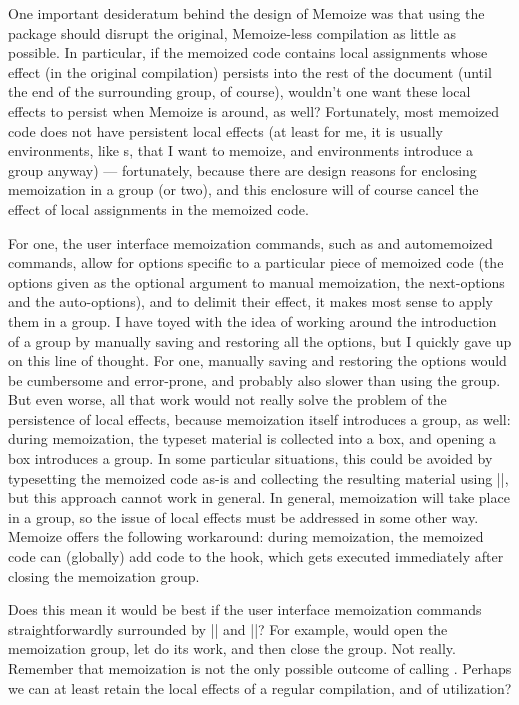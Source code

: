\documentclass[a4paper,11pt]{article}
\begin{document}
\begin{tcolorbox}[title=\string\Memoize\ and grouping, enhanced, breakable,
    label=frame:grouping]
  One important desideratum behind the design of Memoize was that using the
  package should disrupt the original, Memoize-less compilation as little as
  possible.  In particular, if the memoized code contains local assignments
  whose effect (in the original compilation) persists into the rest of the
  document (until the end of the surrounding  group, of course),
  wouldn't one want these local effects to persist when Memoize is around, as
  well?  Fortunately, most memoized code does not have persistent local effects
  (at least for me, it is usually environments, like s, that I
  want to memoize, and environments introduce a group anyway) --- fortunately,
  because there are design reasons for enclosing memoization in a 
  group (or two), and this enclosure will of course cancel the effect of local
  assignments in the memoized code.

  For one, the user interface memoization commands, such as  and
  automemoized commands, allow for options specific to a particular piece of
  memoized code (the options given as the optional argument to manual
  memoization, the next-options and the auto-options), and to delimit their
  effect, it makes most sense to apply them in a group.  I have toyed with the
  idea of working around the introduction of a group by manually saving and
  restoring all the options, but I quickly gave up on this line of thought.
  For one, manually saving and restoring the options would be cumbersome and
  error-prone, and probably also slower than using the group.  But even worse,
  all that work would not really solve the problem of the persistence of local
  effects, because memoization itself introduces a group, as well: during
  memoization, the typeset material is collected into a box, and opening a box
  introduces a group.  In some particular situations, this could be avoided by
  typesetting the memoized code as-is and collecting the resulting material
  using |\lastbox|, but this approach cannot work in general.  In general,
  memoization will take place in a group, so the issue of local effects must be
  addressed in some other way.  Memoize offers the following workaround: during
  memoization, the memoized code can (globally) add code to the  hook, which gets executed immediately after closing the
  memoization group.

  Does this mean it would be best if the user interface memoization commands
  straightforwardly surrounded  by |\begingroup| and
  |\endgroup|?  For example,  would open the memoization group, let
   do its work, and then close the group.  Not really.
  Remember that memoization is not the only possible outcome of calling
  .  Perhaps we can at least retain the local effects of a
  regular compilation, and of utilization?


\end{tcolorbox}
\end{document}
